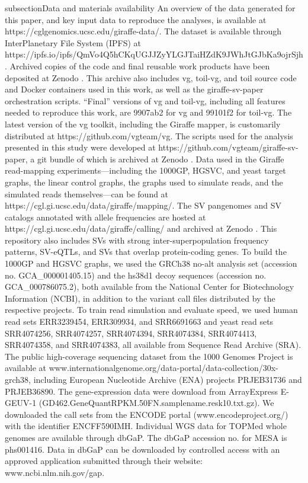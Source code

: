 \documentclass[11pt]{ucscthesis}
\begin{document}
subsection{Data and materials availability}
\label{sec:aim2:code-data}
An overview of the data generated for this paper, and key input data to reproduce the analyses, is available at https://cglgenomics.ucsc.edu/giraffe-data/.
The dataset is available through InterPlanetary File System (IPFS) at https://ipfs.io/ipfs/QmVo4Q5hCKqUGJJZyYLGJTaiHZdK9JWhJtGJbKa9ojrSjh.
Archived copies of the code and final reusable work products have been deposited at Zenodo \cite{zenodocode}.
This archive also includes vg, toil-vg, and toil source code and Docker containers used in this work, as well as the giraffe-sv-paper orchestration scripts.
“Final” versions of vg and toil-vg, including all features needed to reproduce this work, are 9907ab2 for vg and 99101f2 for toil-vg.
The latest version of the vg toolkit, including the Giraffe mapper, is customarily distributed at https://github.com/vgteam/vg.
The scripts used for the analysis presented in this study were developed at https://github.com/vgteam/giraffe-sv-paper, a git bundle of which is archived at Zenodo \cite{zenodocode}.
Data used in the Giraffe read-mapping experiments—including the 1000GP, HGSVC, and yeast target graphs, the linear control graphs, the graphs used to simulate reads, and the simulated reads themselves—can be found at https://cgl.gi.ucsc.edu/data/giraffe/mapping/.
The SV pangenomes and SV catalogs annotated with allele frequencies are hosted at 
https://cgl.gi.ucsc.edu/data/giraffe/calling/ and archived at Zenodo \cite{zenodocode}.
This repository also includes SVs with strong inter-superpopulation frequency patterns, SV-eQTLs, and SVs that overlap protein-coding genes.
To build the 1000GP and HGSVC graphs, we used the GRCh38 no-alt analysis set (accession no. GCA\_000001405.15) and the hs38d1 decoy sequences (accession no. GCA\_000786075.2), both available from the National Center for Biotechnology Information (NCBI), in addition to the variant call files distributed by the respective projects. To train read simulation and evaluate speed, we used human read sets ERR3239454, ERR309934, and SRR6691663 and yeast read sets SRR4074256, SRR4074257, SRR4074394, SRR4074384, SRR4074413, SRR4074358, and SRR4074383, all available from Sequence Read Archive (SRA).
The public high-coverage sequencing dataset from the 1000 Genomes Project \cite{1000gp_nygc_2021} is available at www.internationalgenome.org/data-portal/data-collection/30x-grch38, including European Nucleotide Archive (ENA) projects PRJEB31736 and PRJEB36890.
The gene-expression data were download from ArrayExpress E-GEUV-1 (GD462.GeneQuantRPKM.50FN.samplename.resk10.txt.gz).
We downloaded the call sets from the ENCODE portal \cite{sloan_encode_2016} (www.encodeproject.org/) with the identifier ENCFF590IMH.
Individual WGS data for TOPMed whole genomes are available through dbGaP.
The dbGaP accession no. for MESA is phs001416.
Data in dbGaP can be downloaded by controlled access with an approved application submitted through their website: www.ncbi.nlm.nih.gov/gap.
\end{document}
